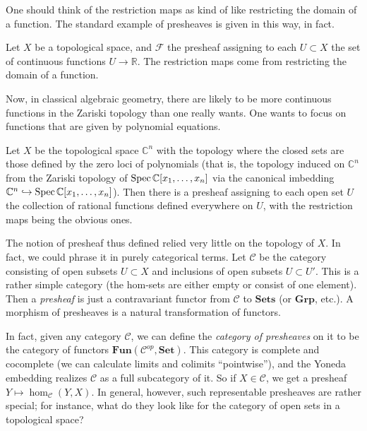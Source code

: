 One should think of the restriction maps as kind of like
restricting the
domain of a function.
The standard example of presheaves is given in this way, in
fact.

\begin{example} 
Let $X$ be a topological space, and $\mathcal{F}$ the presheaf
assigning to
each $U \subset X$ the set of continuous functions $U \to
\mathbb{R}$. The
restriction maps come from restricting the domain of a function.\end{example} 

Now, in classical algebraic geometry, there are likely to be
more
continuous functions in the Zariski topology than one really
wants. One wants
to focus on functions that are given by polynomial equations.

\begin{example} 
Let $X$ be the topological space $\mathbb{C}^n$ with the
topology where the
closed sets are those defined by the zero loci of polynomials
(that is, the
topology induced on $\mathbb{C}^n$ from the Zariski topology of
$\operatorname{Spec}
\mathbb{C}[x_1, \dots, x_n]$ via the canonical imbedding
$\mathbb{C}^n
\hookrightarrow \operatorname{Spec} \mathbb{C}[x_1, \dots, x_n]$). Then there
is a presheaf
assigning to each open set $U$ the collection of rational
functions defined
everywhere on $U$, with the restriction maps being the obvious
ones.
\end{example} 




\begin{remark} 
The notion of presheaf thus defined relied very little on the topology of $X$. 
In fact, we could phrase it in purely categorical terms. Let $\mathcal{C}$ be
the category consisting of open subsets $U \subset X$ and inclusions of open
subsets $U
\subset U'$. This is a rather simple category (the hom-sets are either empty
or consist of one element). Then a \emph{presheaf} is just a contravariant
functor from $\mathcal{C}$ to $\mathbf{Sets}$ (or $\mathbf{Grp}$, etc.). A
morphism of presheaves is a natural transformation of functors.

In fact, given any category $\mathcal{C}$, we can define the \emph{category of
presheaves} on it to be the category of functors $\mathbf{Fun}(\mathcal{C}^{op}, \mathbf{Set})$.
This category is complete and cocomplete (we can calculate limits and colimits
``pointwise''), and the Yoneda embedding realizes $\mathcal{C}$ as a full
subcategory of it. So if $X \in \mathcal{C}$, we get a presheaf $Y \mapsto
\hom_{\mathcal{C}}(Y, X)$. In general, however, such representable presheaves
are rather special; for instance, what do they look like for the category of
open sets in a topological space?
\end{remark} 

